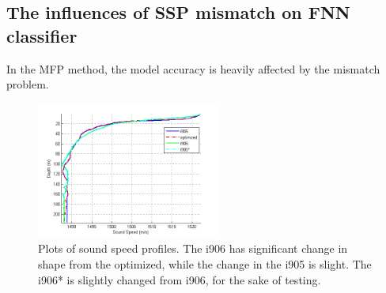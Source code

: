 \subsection{The influences of SSP mismatch on FNN classifier}
In the MFP method, the model accuracy is heavily affected by the mismatch problem\cite{tolstoy1989sensitivity,feuillade1989environmental,del1988effects}.
\begin{figure}
\includegraphics[width=6cm]{figure/ssp4}
\caption{Plots of sound speed profiles. The i906 has significant change in shape from the optimized, while the change in the i905 is slight. The i906{*} is slightly changed from i906, for the sake of testing.}
\end{figure}
